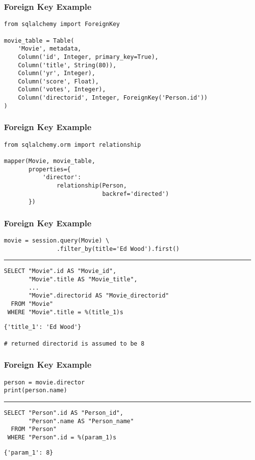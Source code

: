 \documentclass[dvipsnames]{beamer}
\theoremstyle{plain}
\begin{document}
\begin{frame}[fragile]
  \frametitle{Foreign Key Example}

  \begin{lstlisting}
from sqlalchemy import ForeignKey

movie_table = Table(
    'Movie', metadata,
    Column('id', Integer, primary_key=True),
    Column('title', String(80)),
    Column('yr', Integer),
    Column('score', Float),
    Column('votes', Integer),
    Column('directorid', Integer, ForeignKey('Person.id'))
)
  \end{lstlisting}
\end{frame}

\begin{frame}[fragile]
  \frametitle{Foreign Key Example}

  \begin{lstlisting}
from sqlalchemy.orm import relationship

mapper(Movie, movie_table,
       properties={
           'director':
               relationship(Person,
                            backref='directed')
       })
  \end{lstlisting}
\end{frame}

\begin{frame}[fragile]
  \frametitle{Foreign Key Example}

  \begin{lstlisting}
movie = session.query(Movie) \
               .filter_by(title='Ed Wood').first()
  \end{lstlisting}
  \hrule

  \begin{lstlisting}[language=FullSQL]
SELECT "Movie".id AS "Movie_id",
       "Movie".title AS "Movie_title",
       ...
       "Movie".directorid AS "Movie_directorid"
  FROM "Movie"
 WHERE "Movie".title = %(title_1)s
  \end{lstlisting}

  \begin{lstlisting}
{'title_1': 'Ed Wood'}

# returned directorid is assumed to be 8
  \end{lstlisting}
\end{frame}

\begin{frame}[fragile]
  \frametitle{Foreign Key Example}

  \begin{lstlisting}
person = movie.director
print(person.name)
  \end{lstlisting}
  \hrule

  \begin{lstlisting}[language=FullSQL]
SELECT "Person".id AS "Person_id",
       "Person".name AS "Person_name"
  FROM "Person"
 WHERE "Person".id = %(param_1)s
  \end{lstlisting}

  \begin{lstlisting}
{'param_1': 8}
  \end{lstlisting}
\end{frame}
\end{document}
